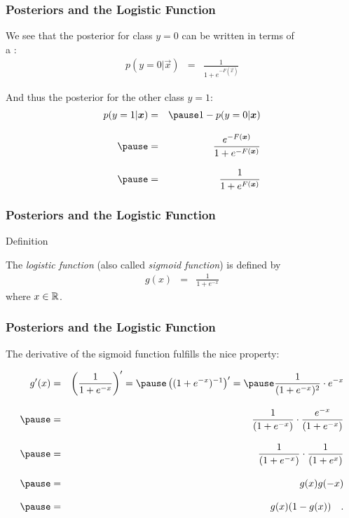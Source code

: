 \begin{frame}
  \frametitle{Posteriors and the Logistic Function \cont}

  We see that the posterior for class $y = 0$ can be written in terms of \\
  a :
%
  \begin{eqnarray*}
    p(y=0| \vec x) &=& \frac{1}{1+e^{-F(\vec{x})}}
  \end{eqnarray*}
  \pause

  And thus the posterior for the other class $y = 1$:
%
  \begin{eqnarray*}
    p(y=1| \vec x) &=& \pause 1- p(y=0| \vec x) \\[.3cm] \pause
                   &=& \frac{e^{-F(\vec x)}}{1+e^{-F(\vec{x})}} \\[.3cm] \pause
                   &=&  \frac{1}{1+e^{F(\vec{x})}}
  \end{eqnarray*}
\end{frame}


\begin{frame}
  \frametitle{Posteriors and the Logistic Function \cont}

  \begin{citeblock}{Definition}

    The {\em logistic function} (also called {\em sigmoid function}) is defined by
    \begin{eqnarray*}
      g(x) &=& \frac{1}{1+e^{-x}}
    \end{eqnarray*}
    where $x\in \mathbb{R}$.
  \end{citeblock}
\end{frame}


\begin{frame}
  \frametitle{Posteriors and the Logistic Function \cont}

  The derivative of the sigmoid function fulfills the nice property:

  \begin{eqnarray*}
    g'(x) &=& \left( \frac{1}{1+e^{-x}} \right)' = \pause \left( (1+e^{-x})^{-1}\right)'= \pause \frac{1}{(1+e^{-x})^2}\cdot e^{-x} \\[.3cm] \pause
          &=& \frac{1}{(1+e^{-x})} \cdot \frac{e^{-x}}{(1+e^{-x})} \\[.3cm] \pause
          &=& \frac{1}{(1+e^{-x})} \cdot \frac{1}{(1+e^{x})} \\[.3cm] \pause
          &=& g(x)g(-x) \\[.3cm] \pause
          &=& g(x)(1-g(x)) \quad.
  \end{eqnarray*}
\end{frame}


